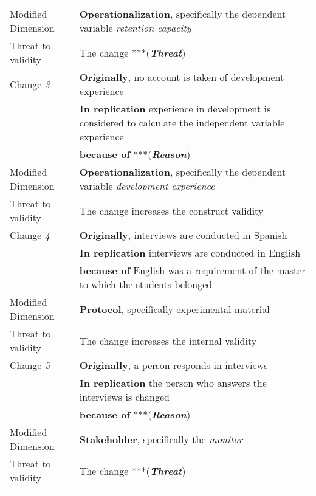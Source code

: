 \begin{table*}[h]
\begin{tabularx}{\textwidth}{
  >{\hsize=0.3\hsize}X
  >{\hsize=0.8\hsize}X}
    Modified Dimension & 
   \textbf{Operationalization}, specifically the dependent variable  \textit {retention capacity} \\ 
    Threat to validity  & The change ***(\textbf{\textit{Threat}}) \\ \hline
 
    Change \textit{3}   & \textbf{Originally}, no account is taken of development experience \\& \textbf{In replication} experience in development is considered to calculate the independent variable experience  \\  
    & \textbf{because of} ***(\textbf{\textit{Reason}})\\

    Modified Dimension & 
    \textbf{Operationalization}, specifically the dependent variable  \textit {development experience} \\   
     Threat to validity  & The change increases the construct validity \\ \hline

    Change \textit{4}   & \textbf{Originally}, interviews are conducted in Spanish \\& \textbf{In replication} interviews are conducted in English \\& \textbf{because of} English was a requirement of the master to which the students belonged \\ 

    Modified Dimension & 
    \textbf{Protocol}, specifically experimental material \\   
    Threat to validity  & The change increases the internal validity \\  \hline
    
     Change \textit{5}   & \textbf{Originally}, a person responds in interviews \\& \textbf{In replication} the person who answers the interviews is changed  \\ 
    & \textbf{because of} ***(\textbf{\textit{Reason}})\\

    Modified Dimension & 
    \textbf{Stakeholder}, specifically the \textit {monitor} \\   
     Threat to validity  & The change ***(\textbf{\textit{Threat}}) \\
   \noalign{\smallskip\smallskip}\hline
	
	\end{tabularx}  
	
\end{table*}
